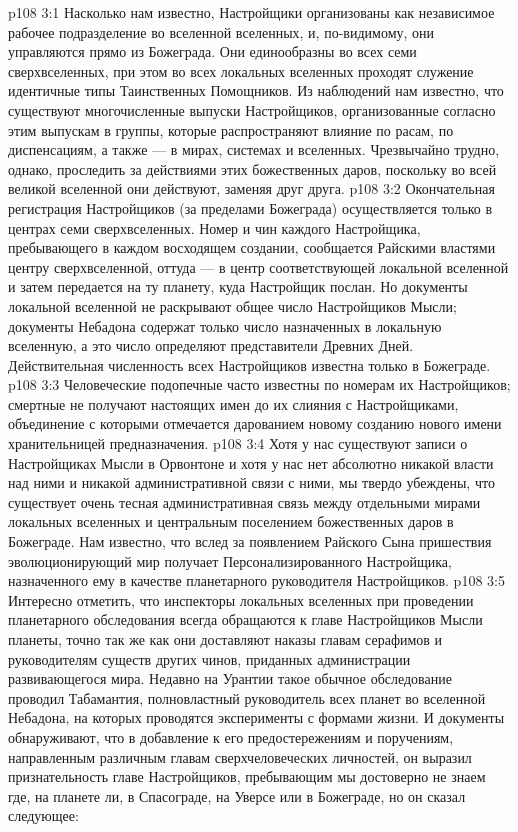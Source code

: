 \vs p108 3:1 Насколько нам известно, Настройщики организованы как независимое рабочее подразделение во вселенной вселенных, и, по\hyp{}видимому, они управляются прямо из Божеграда. Они единообразны во всех семи сверхвселенных, при этом во всех локальных вселенных проходят служение идентичные типы Таинственных Помощников. Из наблюдений нам известно, что существуют многочисленные выпуски Настройщиков, организованные согласно этим выпускам в группы, которые распространяют влияние по расам, по диспенсациям, а также --- в мирах, системах и вселенных. Чрезвычайно трудно, однако, проследить за действиями этих божественных даров, поскольку во всей великой вселенной они действуют, заменяя друг друга.
\vs p108 3:2 Окончательная регистрация Настройщиков (за пределами Божеграда) осуществляется только в центрах семи сверхвселенных. Номер и чин каждого Настройщика, пребывающего в каждом восходящем создании, сообщается Райскими властями центру сверхвселенной, оттуда --- в центр соответствующей локальной вселенной и затем передается на ту планету, куда Настройщик послан. Но документы локальной вселенной не раскрывают общее число Настройщиков Мысли; документы Небадона содержат только число назначенных в локальную вселенную, а это число определяют представители Древних Дней. Действительная численность всех Настройщиков известна только в Божеграде.
\vs p108 3:3 Человеческие подопечные часто известны по номерам их Настройщиков; смертные не получают настоящих имен до их слияния с Настройщиками, объединение с которыми отмечается дарованием новому созданию нового имени хранительницей предназначения.
\vs p108 3:4 Хотя у нас существуют записи о Настройщиках Мысли в Орвонтоне и хотя у нас нет абсолютно никакой власти над ними и никакой административной связи с ними, мы твердо убеждены, что существует очень тесная административная связь между отдельными мирами локальных вселенных и центральным поселением божественных даров в Божеграде. Нам известно, что вслед за появлением Райского Сына пришествия эволюционирующий мир получает Персонализированного Настройщика, назначенного ему в качестве планетарного руководителя Настройщиков.
\vs p108 3:5 \pc Интересно отметить, что инспекторы локальных вселенных при проведении планетарного обследования всегда обращаются к главе Настройщиков Мысли планеты, точно так же как они доставляют наказы главам серафимов и руководителям существ других чинов, приданных администрации развивающегося мира. Недавно на Урантии такое обычное обследование проводил Табамантия, полновластный руководитель всех планет во вселенной Небадона, на которых проводятся эксперименты с формами жизни. И документы обнаруживают, что в добавление к его предостережениям и поручениям, направленным различным главам сверхчеловеческих личностей, он выразил признательность главе Настройщиков, пребывающим мы достоверно не знаем где, на планете ли, в Спасограде, на Уверсе или в Божеграде, но он сказал следующее:
